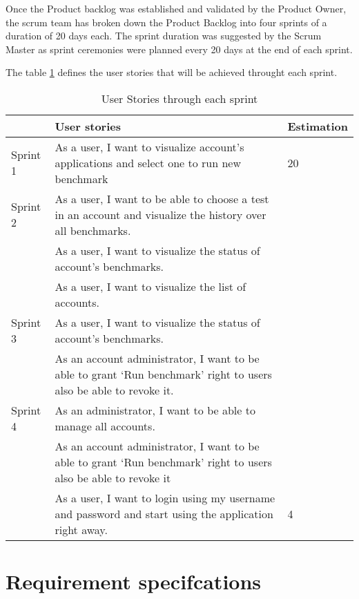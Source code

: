 Once the Product backlog was established and validated by the Product Owner, the
scrum team has broken down the Product Backlog into four sprints of a duration
of 20 days each. The sprint duration was suggested by the Scrum Master as sprint
ceremonies were planned every 20 days at the end of each sprint.

The table \hyperref[sprints]{\ref{sprints}} defines the user stories that will
be achieved throught each sprint.

\begin{table}[]
\centering
\label{sprints}
\begin{tabular}{|p{2cm}|p{7cm}|p{2cm}|}
                          \\ \hline
                          &  User stories & Estimation \\ \hline
Sprint 1                 &  As a user, I want to visualize account’s applications and select one to run new benchmark &  20\\ \hline
{\multirow{3}{*}{}} Sprint 2 &  As a user, I want to be able to choose a test in an account and visualize the history over all benchmarks.&  \\ \cline{2-3} 
{}                  &  As a user, I want to visualize the status of account’s benchmarks. &  \\ \cline{2-3} 
{}                  & As a user, I want to visualize the list of accounts. &  \\ \hline
{\multirow{2}{*}{}} Sprint 3 & As a user, I want to visualize the status of account’s benchmarks. &  \\ \cline{2-3} 
{}                  &  As an account administrator, I want to be able to grant ‘Run benchmark’  right to users also be able to revoke it.&  \\ \hline
{\multirow{3}{*}{}} Sprint 4 &  As an administrator, I want to be able to manage all accounts. &  \\ \cline{2-3} 
{}                  &  As an account administrator, I want to be able to grant ‘Run benchmark’  right to users also be able to revoke it&  \\ \cline{2-3} 
{}                  & As a user, I want to login using my username and password and start using the application right away. & 4  \\ \hline
\end{tabular}
\caption{User Stories through each sprint}
\end{table}
\section{Requirement specifcations}
